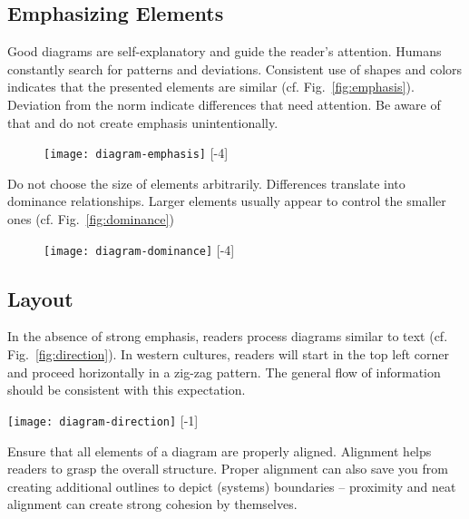 \subsection{Emphasizing Elements}

Good diagrams are self-explanatory and guide the reader's attention. Humans constantly search for patterns and deviations. Consistent use of shapes and colors indicates that the presented elements are similar (cf. Fig.~\ref{fig:emphasis}). Deviation from the norm indicate differences that need attention. Be aware of that and do not create emphasis unintentionally.

\begin{figure}[t]
\centering
\texttt{[image: diagram-emphasis]}
[-4\baselineskip]
\end{figure}

Do not choose the size of elements arbitrarily. Differences translate into dominance relationships. Larger elements usually appear to control the smaller ones (cf. Fig.~\ref{fig:dominance})

\begin{figure}[t]
\centering
\texttt{[image: diagram-dominance]}
[-4\baselineskip]
\end{figure}


\subsection{Layout}

In the absence of strong emphasis, readers process diagrams similar to text (cf. Fig.~\ref{fig:direction}). In western cultures, readers will start in the top left corner and proceed horizontally in a zig-zag pattern. The general flow of information should be consistent with this expectation.

\begin{marginfigure}
\centering
\texttt{[image: diagram-direction]}
[-1\baselineskip]
\end{marginfigure}


Ensure that all elements of a diagram are properly aligned. Alignment helps readers to grasp the overall structure. Proper alignment can also save you from creating additional outlines to depict (systems) boundaries – proximity and neat alignment can create strong cohesion by themselves.

